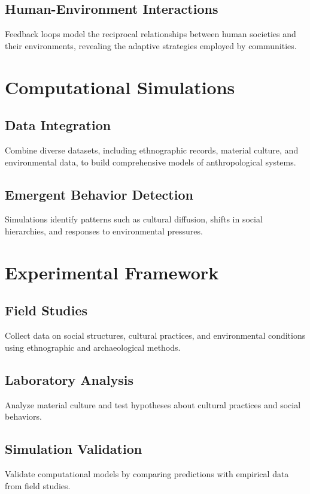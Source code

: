 \documentclass{article}
\theoremstyle{plain}
\begin{document}
\subsection{Human-Environment Interactions}
Feedback loops model the reciprocal relationships between human societies and their environments, revealing the adaptive strategies employed by communities.

\section{Computational Simulations}

\subsection{Data Integration}
Combine diverse datasets, including ethnographic records, material culture, and environmental data, to build comprehensive models of anthropological systems.

\subsection{Emergent Behavior Detection}
Simulations identify patterns such as cultural diffusion, shifts in social hierarchies, and responses to environmental pressures.

\section{Experimental Framework}

\subsection{Field Studies}
Collect data on social structures, cultural practices, and environmental conditions using ethnographic and archaeological methods.

\subsection{Laboratory Analysis}
Analyze material culture and test hypotheses about cultural practices and social behaviors.

\subsection{Simulation Validation}
Validate computational models by comparing predictions with empirical data from field studies.
\end{document}
